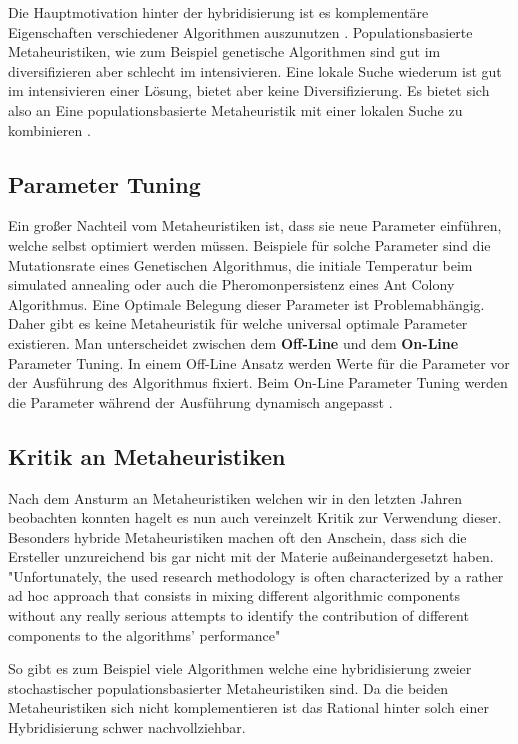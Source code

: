 Die Hauptmotivation hinter der hybridisierung ist es komplementäre Eigenschaften verschiedener Algorithmen auszunutzen \cite*{MetaheuristicsSurvey}. Populationsbasierte Metaheuristiken, wie zum Beispiel genetische Algorithmen sind gut im diversifizieren aber schlecht im intensivieren. Eine lokale Suche wiederum ist gut im intensivieren einer Lösung, bietet aber keine Diversifizierung. Es bietet sich also an Eine populationsbasierte Metaheuristik mit einer lokalen Suche zu kombinieren \cite*{MetaheuristicsEGT}.

\subsection*{Parameter Tuning}
Ein großer Nachteil vom Metaheuristiken ist, dass sie neue Parameter einführen, welche selbst optimiert werden müssen. Beispiele für solche Parameter sind die Mutationsrate eines Genetischen Algorithmus, die initiale Temperatur beim simulated annealing oder auch die Pheromonpersistenz eines Ant Colony Algorithmus. Eine Optimale Belegung dieser Parameter ist Problemabhängig. Daher gibt es keine Metaheuristik für welche universal optimale Parameter existieren. Man unterscheidet zwischen dem \textbf{Off-Line} und dem \textbf{On-Line} Parameter Tuning. In einem Off-Line Ansatz werden Werte für die Parameter vor der Ausführung des Algorithmus fixiert. Beim On-Line Parameter Tuning werden die Parameter während der Ausführung dynamisch angepasst \cite*{MetaheuristicsEGT}.

\subsection*{Kritik an Metaheuristiken}
Nach dem Ansturm an Metaheuristiken welchen wir in den letzten Jahren beobachten konnten hagelt es nun auch vereinzelt Kritik zur Verwendung dieser. Besonders hybride Metaheuristiken machen oft den Anschein, dass sich die Ersteller unzureichend bis gar nicht mit der Materie außeinandergesetzt haben.
"Unfortunately, the used research methodology is often
characterized by a rather ad hoc approach that consists in mixing different algorithmic components without any really serious
attempts to identify the contribution of different components to the
algorithms' performance" \cite*{MetaheuristicsSurvey}

So gibt es zum Beispiel viele Algorithmen welche eine hybridisierung zweier stochastischer populationsbasierter Metaheuristiken sind. Da die beiden Metaheuristiken sich nicht komplementieren ist das Rational hinter solch einer Hybridisierung schwer nachvollziehbar.

